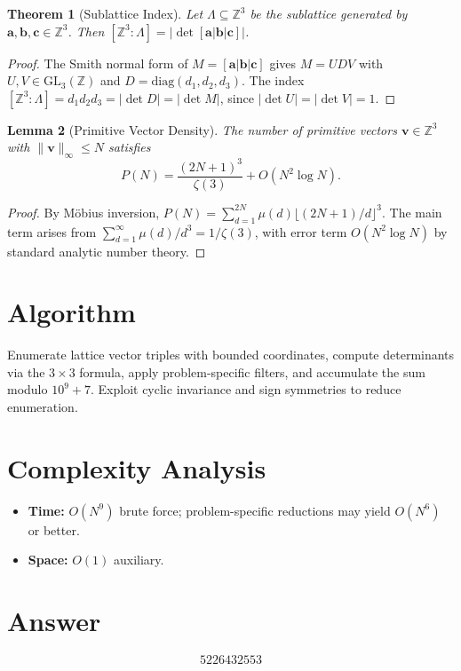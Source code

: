 \documentclass[11pt]{article}
\newtheorem{theorem}{Theorem}
\newtheorem{lemma}[theorem]{Lemma}
\theoremstyle{definition}
\begin{document}
\begin{theorem}[Sublattice Index]
Let $\Lambda \subseteq \mathbb{Z}^3$ be the sublattice generated by $\mathbf{a},\mathbf{b},\mathbf{c}\in\mathbb{Z}^3$. Then $[\mathbb{Z}^3:\Lambda]=|\det[\mathbf{a}|\mathbf{b}|\mathbf{c}]|$.
\end{theorem}

\begin{proof}
The Smith normal form of $M=[\mathbf{a}|\mathbf{b}|\mathbf{c}]$ gives $M=UDV$ with $U,V\in\mathrm{GL}_3(\mathbb{Z})$ and $D=\mathrm{diag}(d_1,d_2,d_3)$. The index $[\mathbb{Z}^3:\Lambda]=d_1 d_2 d_3 = |\det D|=|\det M|$, since $|\det U|=|\det V|=1$.
\end{proof}

\begin{lemma}[Primitive Vector Density]
The number of primitive vectors $\mathbf{v}\in\mathbb{Z}^3$ with $\|\mathbf{v}\|_\infty \le N$ satisfies
\[
P(N) = \frac{(2N+1)^3}{\zeta(3)} + O(N^2 \log N).
\]
\end{lemma}

\begin{proof}
By M\"obius inversion, $P(N) = \sum_{d=1}^{2N}\mu(d)\lfloor(2N+1)/d\rfloor^3$. The main term arises from $\sum_{d=1}^{\infty}\mu(d)/d^3 = 1/\zeta(3)$, with error term $O(N^2\log N)$ by standard analytic number theory.
\end{proof}

\section{Algorithm}

Enumerate lattice vector triples with bounded coordinates, compute determinants via the $3\times 3$ formula, apply problem-specific filters, and accumulate the sum modulo $10^9+7$. Exploit cyclic invariance and sign symmetries to reduce enumeration.

\section{Complexity Analysis}

\begin{itemize}
\item \textbf{Time:} $O(N^9)$ brute force; problem-specific reductions may yield $O(N^6)$ or better.
\item \textbf{Space:} $O(1)$ auxiliary.
\end{itemize}

\section{Answer}

\[
\boxed{5226432553}
\]
\end{document}
